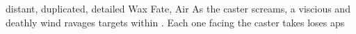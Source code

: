  {distant, duplicated, detailed}%
  {Wax}%
  {Fate, Air}%
  {}%
  {As the caster screams, a viscious and deathly wind ravages  targets within \spellRange.
    Each one facing the caster takes loses  \glspl{ap}}%
  {}
